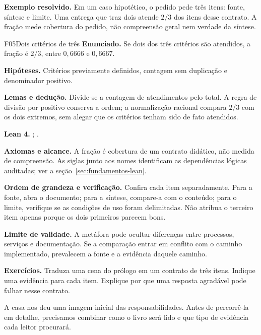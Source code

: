 \begin{resultado}
\textbf{Exemplo resolvido.} Em um caso hipotético, o pedido pede três itens: fonte, síntese e limite. Uma entrega que traz dois atende $2/3$ dos itens desse contrato. A fração mede cobertura do pedido, não compreensão geral nem verdade da síntese.
\end{resultado}
\begin{formalizacao}{F05}{Dois critérios de três}
\textbf{Enunciado.} Se dois dos três critérios são atendidos, a fração é $2/3$, entre $0{,}6666$ e $0{,}6667$.

\textbf{Hipóteses.} Critérios previamente definidos, contagem sem duplicação e denominador positivo.

\textbf{Lemas e dedução.} Divide-se a contagem de atendimentos pelo total. A regra de divisão por positivo conserva a ordem; a normalização racional compara $2/3$ com os dois extremos, sem alegar que os critérios tenham sido de fato atendidos.

\textbf{Lean 4.} ; .

\textbf{Axiomas e alcance.} A fração é cobertura de um contrato didático, não medida de compreensão. As siglas junto aos nomes identificam as dependências lógicas auditadas; ver a seção~\ref{sec:fundamentos-lean}.
\end{formalizacao}


\begin{resultado}
\textbf{Ordem de grandeza e verificação.} Confira cada item separadamente. Para a fonte, abra o documento; para a síntese, compare-a com o conteúdo; para o limite, verifique se as condições de uso foram delimitadas. Não atribua o terceiro item apenas porque os dois primeiros parecem bons.
\end{resultado}

\begin{aviso}
\textbf{Limite de validade.} A metáfora pode ocultar diferenças entre processos, serviços e documentação. Se a comparação entrar em conflito com o caminho implementado, prevalecem a fonte e a evidência daquele caminho.
\end{aviso}

\begin{resultado}
\textbf{Exercícios.} Traduza uma cena do prólogo em um contrato de três itens. Indique uma evidência para cada item. Explique por que uma resposta agradável pode falhar nesse contrato.
\end{resultado}

A casa nos deu uma imagem inicial das responsabilidades. Antes de percorrê-la em detalhe, precisamos combinar como o livro será lido e que tipo de evidência cada leitor procurará.
